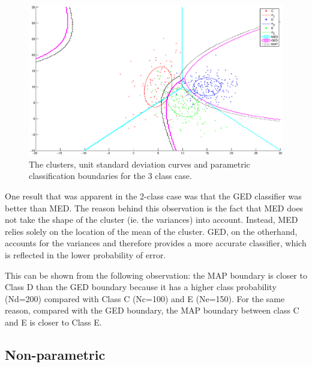 \begin{figure}
  \begin{center}
  	\label{fig:3param}
    \caption{The clusters, unit standard deviation curves and
    parametric classification boundaries for the 3 class case.}
    \includegraphics[width=15cm]{figures/3-param}
  \end{center}
\end{figure}

One result that was apparent in the 2-class case was that the GED classifier 
was better than MED.  The reason behind this observation is the fact that MED
does not take the shape of the cluster (ie. the variances) into account. 
Instead, MED relies solely on the location of the mean of the cluster. GED, on
the otherhand, accounts for the variances and therefore provides a more
accurate classifier, which is reflected in the lower probability of error.

This can be shown from the following observation: the MAP boundary is closer to
Class D than the GED boundary because it has a higher class probability
(Nd=200) compared with Class C (Nc=100) and E (Ne=150). For the same reason, 
compared with the GED boundary, the MAP boundary between class C and E is 
closer to Class E.

\subsection{Non-parametric}

